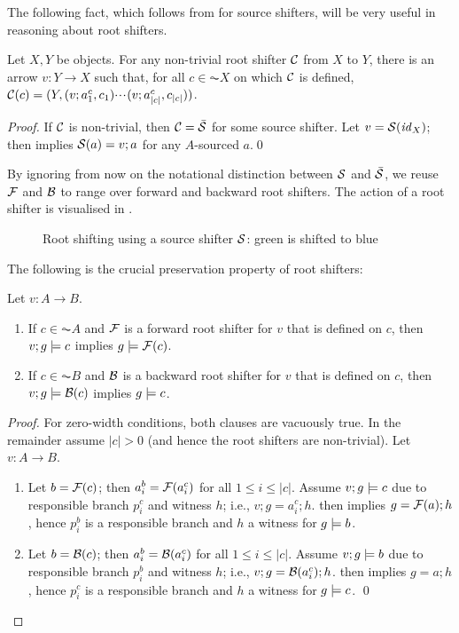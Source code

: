\begin{fullorname}
The following fact, which follows from  for source shifters, will be very useful in reasoning about root shifters.
%
\begin{lemma}
Let $X,Y$ be objects. For any non-trivial root shifter $\mathcal{C}$ from $X$ to $Y$, there is an arrow $v:Y\to X$ such that, for all $c\in \AC X$ on which $\mathcal{C}$ is defined, $\mathcal{C}(c)= (Y,(v;a^c_1,c_1){\cdotp\mkern-2mu\cdotp\mkern-2mu\cdotp\mkern1mu} (v;a^c_{|c|},c_{|c|}))$.
\end{lemma}
%
\begin{proof}
If $\mathcal{C}$ is non-trivial, then $\mathcal{C}=\bar{\mathcal{S}}$ for some source shifter. Let $v=\mathcal{S}(\mathit{id}_X)$; then  implies $\mathcal{S}(a)=v;a$ for any $A$-sourced $a$.\qed
\end{proof}
\end{fullorname}
%
By ignoring from now on the notational distinction between $\mathcal{S}$ and $\bar{\mathcal{S}}$, we reuse $\mathcal{F}$ and $\mathcal{B}$ to range over forward and backward root shifters. The action of a root shifter is visualised in .
%
\begin{figure}[t]
\centering

\caption{Root shifting using a source shifter $\mathcal{S}$: green is shifted to blue}
\end{figure}
%
The following is the crucial preservation property of root shifters:
%
\begin{proposition}
Let $v:A\to B$.
\begin{enumerate}[topsep=\smallskipamount]
\item If $c\in \AC A$ and $\mathcal{F}$ is a forward root shifter for $v$ that is defined on $c$, then $v;g\models c$ implies $g\models \mathcal{F}(c)$.
\item If $c\in \AC B$ and $\mathcal{B}$ is a backward root shifter for $v$ that is defined on $c$, then $v;g\models \mathcal{B}(c)$ implies $g\models c$.
\end{enumerate}
\end{proposition}
%
\begin{fullorname}
\begin{proof}
For zero-width conditions, both clauses are vacuously true. In the remainder assume $|c|>0$ (and hence the root shifters are non-trivial). Let $v:A\to B$.
\begin{enumerate}
\item Let $b=\mathcal{F}(c)$; then $a^b_i=\mathcal{F}(a^c_i)$ for all $1\leq i\leq |c|$. Assume $v;g\models c$ due to responsible branch $p^c_i$ and witness $h$; i.e., $v;g=a^c_i;h$.  then implies $g=\mathcal{F}(a);h$, hence $p^b_i$ is a responsible branch and $h$ a witness for $g\models b$.
\item Let $b=\mathcal{B}(c)$; then $a^b_i=\mathcal{B}(a^c_i)$ for all $1\leq i\leq |c|$. Assume $v;g\models b$ due to responsible branch $p^b_i$ and witness $h$; i.e., $v;g=\mathcal{B}(a^c_i);h$.  then implies $g=a;h$, hence $p^c_i$ is a responsible branch and $h$ a witness for $g\models c$.
\qed
\end{enumerate}
\end{proof}
\end{fullorname}
